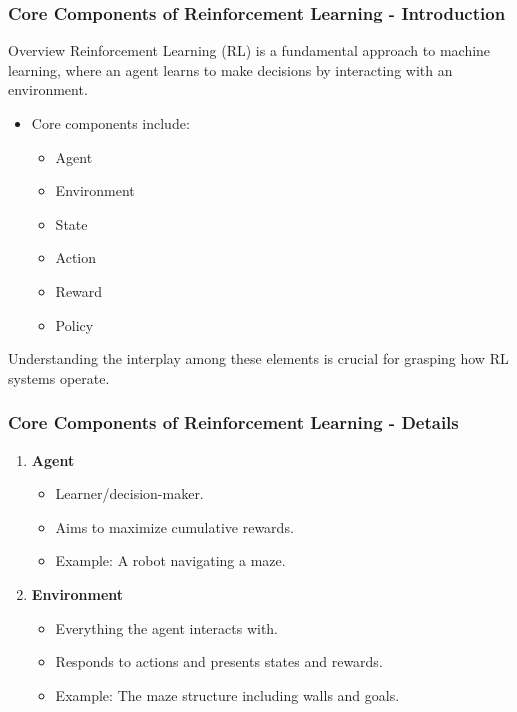 \documentclass[aspectratio=169]{beamer}
\begin{document}
\begin{frame}[fragile]
    \frametitle{Core Components of Reinforcement Learning - Introduction}
    \begin{block}{Overview}
        Reinforcement Learning (RL) is a fundamental approach to machine learning, where an agent learns to make decisions by interacting with an environment.
        \begin{itemize}
            \item Core components include:
            \begin{itemize}
                \item Agent
                \item Environment
                \item State
                \item Action
                \item Reward
                \item Policy
            \end{itemize}
        \end{itemize}
        Understanding the interplay among these elements is crucial for grasping how RL systems operate.
    \end{block}
\end{frame}

\begin{frame}[fragile]
    \frametitle{Core Components of Reinforcement Learning - Details}
    \begin{enumerate}
        \item \textbf{Agent}
            \begin{itemize}
                \item Learner/decision-maker.
                \item Aims to maximize cumulative rewards.
                \item Example: A robot navigating a maze.
            \end{itemize}
        \item \textbf{Environment}
            \begin{itemize}
                \item Everything the agent interacts with.
                \item Responds to actions and presents states and rewards.
                \item Example: The maze structure including walls and goals.
            \end{itemize}
    \end{enumerate}
\end{frame}
\end{document}

